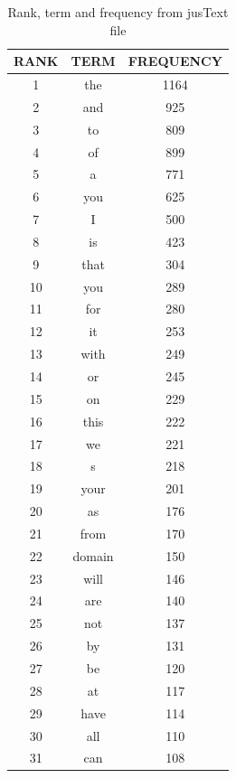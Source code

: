 
\newpage
\begin{table}
\caption{Rank, term and frequency from jusText file}
\begin{center}
  \begin{tabular}{ c | c | c }
    \hline
    RANK & TERM & FREQUENCY \\ \hline
1 & the  &  1164 \\ \hline
2 & and & 925 \\ \hline
3 & to & 809 \\ \hline
4 & of & 899 \\ \hline
5 & a  & 771 \\ \hline
6 & you & 625 \\ \hline
7 & I & 500 \\ \hline
8 & is & 423 \\ \hline
9 & that  & 304 \\ \hline
10 & you  & 289 \\ \hline
11 & for & 280 \\ \hline
12 & it &  253 \\ \hline
13 & with  &  249 \\ \hline
14 & or & 245 \\ \hline
15 & on & 229 \\ \hline
16 & this & 222 \\ \hline
17 & we & 221 \\ \hline
18 & s  & 218 \\ \hline
19 & your  & 201 \\ \hline
20 & as & 176 \\ \hline
21 & from &   170 \\ \hline
22 & domain & 150 \\ \hline
23 & will   & 146 \\ \hline
24 & are & 140 \\ \hline
25 & not & 137 \\ \hline
26 & by & 131 \\ \hline
27 & be & 120 \\ \hline
28 & at & 117 \\ \hline
29 & have &  114 \\ \hline
30 & all  & 110 \\ \hline
31 & can & 108 \\ \hline

\end{tabular}
\end{center}
\end{table}
